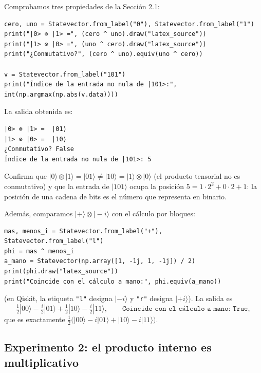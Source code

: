 \documentclass[11pt, a4paper, twoside, openright]{report}
\begin{document}
\noindent Comprobamos tres propiedades de la Sección 2.1:
\begin{lstlisting}
cero, uno = Statevector.from_label("0"), Statevector.from_label("1")
print("|0> ⊗ |1> =", (cero ^ uno).draw("latex_source"))
print("|1> ⊗ |0> =", (uno ^ cero).draw("latex_source"))
print("¿Conmutativo?", (cero ^ uno).equiv(uno ^ cero))

v = Statevector.from_label("101")
print("Índice de la entrada no nula de |101>:", int(np.argmax(np.abs(v.data))))
\end{lstlisting}
\noindent La salida obtenida es:
\begin{lstlisting}[language={}]
|0> ⊗ |1> =  |01⟩
|1> ⊗ |0> =  |10⟩
¿Conmutativo? False
Índice de la entrada no nula de |101>: 5
\end{lstlisting}
\noindent Confirma que $|0\rangle\otimes|1\rangle = |01\rangle \neq |10\rangle = |1\rangle\otimes|0\rangle$ (el producto tensorial no es conmutativo) y que la entrada de $|101\rangle$ ocupa la posición $5 = 1\cdot2^2 + 0\cdot2 + 1$: la posición de una cadena de bits es el número que representa en binario.

\noindent Además, comparamos $|+\rangle\otimes|-i\rangle$ con el cálculo por bloques:
\begin{lstlisting}
mas, menos_i = Statevector.from_label("+"), Statevector.from_label("l")
phi = mas ^ menos_i
a_mano = Statevector(np.array([1, -1j, 1, -1j]) / 2)
print(phi.draw("latex_source"))
print("Coincide con el cálculo a mano:", phi.equiv(a_mano))
\end{lstlisting}
\noindent (en Qiskit, la etiqueta \texttt{"l"} designa $|-i\rangle$ y \texttt{"r"} designa $|{+i}\rangle$). La salida es
\[ \tfrac12|00\rangle - \tfrac i2|01\rangle + \tfrac12|10\rangle - \tfrac i2|11\rangle, \qquad \texttt{Coincide con el cálculo a mano: True}, \]
que es exactamente $\frac12\big(|00\rangle - i|01\rangle + |10\rangle - i|11\rangle\big)$.

\subsection{Experimento 2: el producto interno es multiplicativo}
\end{document}

